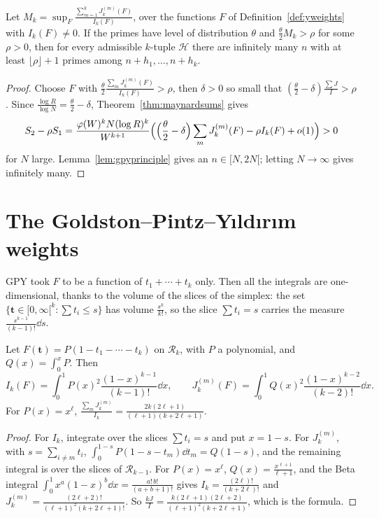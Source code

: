 \begin{corollary}\label{cor:mkcriterion}
Let $M_k=\sup_F\frac{\sum_{m=1}^kJ_k^{(m)}(F)}{I_k(F)}$, over the functions $F$ of Definition~\ref{def:yweights} with $I_k(F)\ne0$. If the primes have level of distribution $\theta$ and $\frac\theta2M_k>\rho$ for some $\rho>0$, then for every admissible $k$-tuple $\mathcal H$ there are infinitely many $n$ with at least $\lfloor\rho\rfloor+1$ primes among $n+h_1,\dots,n+h_k$.
\end{corollary}
\begin{proof}
Choose $F$ with $\frac\theta2\frac{\sum_mJ^{(m)}_k(F)}{I_k(F)}>\rho$, then $\delta>0$ so small that $(\frac\theta2-\delta)\frac{\sum J}I>\rho$. Since $\frac{\log R}{\log N}=\frac\theta2-\delta$, Theorem~\ref{thm:maynardsums} gives
\[
S_2-\rho S_1=\frac{\varphi(W)^kN(\log R)^k}{W^{k+1}}\Bigl(\Bigl(\frac\theta2-\delta\Bigr)\sum_mJ_k^{(m)}(F)-\rho I_k(F)+o(1)\Bigr)>0
\]
for $N$ large. Lemma~\ref{lem:gpyprinciple} gives an $n\in[N,2N[$; letting $N\to\infty$ gives infinitely many.
\end{proof}

\section{The Goldston--Pintz--Yıldırım weights}

GPY took $F$ to be a function of $t_1+\cdots+t_k$ only. Then all the integrals are one-dimensional, thanks to the volume of the slices of the simplex: the set $\{\mathbf t\in[0,\infty[^k:\sum t_i\le s\}$ has volume $\frac{s^k}{k!}$, so the slice $\sum t_i=s$ carries the measure $\frac{s^{k-1}}{(k-1)!}\dd s$.

\begin{proposition}\label{prop:gpyratio}
Let $F(\mathbf t)=P(1-t_1-\cdots-t_k)$ on $\mathcal R_k$, with $P$ a polynomial, and $Q(x)=\int_0^xP$. Then
\[
I_k(F)=\int_0^1P(x)^2\frac{(1-x)^{k-1}}{(k-1)!}\dd x,\qquad J_k^{(m)}(F)=\int_0^1Q(x)^2\frac{(1-x)^{k-2}}{(k-2)!}\dd x.
\]
For $P(x)=x^\ell$, $\frac{\sum_mJ^{(m)}_k}{I_k}=\frac{2k(2\ell+1)}{(\ell+1)(k+2\ell+1)}$.
\end{proposition}
\begin{proof}
For $I_k$, integrate over the slices $\sum t_i=s$ and put $x=1-s$. For $J^{(m)}_k$, with $s=\sum_{i\ne m}t_i$, $\int_0^{1-s}P(1-s-t_m)\dd t_m=Q(1-s)$, and the remaining integral is over the slices of $\mathcal R_{k-1}$. For $P(x)=x^\ell$, $Q(x)=\frac{x^{\ell+1}}{\ell+1}$, and the Beta integral $\int_0^1x^a(1-x)^b\dd x=\frac{a!\,b!}{(a+b+1)!}$ gives $I_k=\frac{(2\ell)!}{(k+2\ell)!}$ and $J^{(m)}_k=\frac{(2\ell+2)!}{(\ell+1)^2(k+2\ell+1)!}$. So $\frac{kJ}I=\frac{k(2\ell+1)(2\ell+2)}{(\ell+1)^2(k+2\ell+1)}$, which is the formula.
\end{proof}

